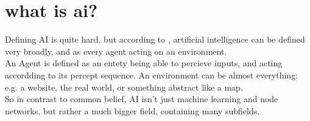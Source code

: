 \chapter{what is ai?}

Defining AI is quite hard, but according to \cite{russellArtificialIntelligenceModern2010}, artificial intelligence can be defined very broadly, and as every agent acting on an environment.\\An Agent is defined as an entety being able to percieve inputs, and acting accordding to its percept sequence. An environment can be almost everything: e.g. a website, the real world, or something abstract like a map.\\ So in contrast to common belief, AI isn't just machine learning and node networks, but rather a much bigger field, containing many subfields.